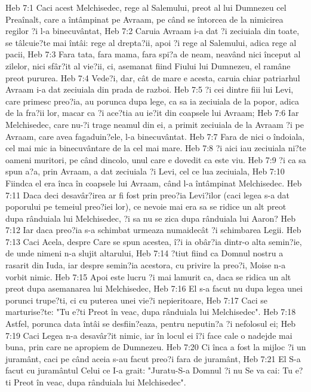Heb 7:1  Caci acest Melchisedec, rege al Salemului, preot al lui Dumnezeu cel Preaînalt, care a întâmpinat pe Avraam, pe când se întorcea de la nimicirea regilor ?i l-a binecuvântat,
Heb 7:2  Caruia Avraam i-a dat ?i zeciuiala din toate, se tâlcuie?te mai întâi: rege al drepta?ii, apoi ?i rege al Salemului, adica rege al pacii,
Heb 7:3  Fara tata, fara mama, fara spi?a de neam, neavând nici început al zilelor, nici sfâr?it al vie?ii, ci, asemanat fiind Fiului lui Dumnezeu, el ramâne preot pururea.
Heb 7:4  Vede?i, dar, cât de mare e acesta, caruia chiar patriarhul Avraam i-a dat zeciuiala din prada de razboi.
Heb 7:5  ?i cei dintre fiii lui Levi, care primesc preo?ia, au porunca dupa lege, ca sa ia zeciuiala de la popor, adica de la fra?ii lor, macar ca ?i ace?tia au ie?it din coapsele lui Avraam;
Heb 7:6  Iar Melchisedec, care nu-?i trage neamul din ei, a primit zeciuiala de la Avraam ?i pe Avraam, care avea fagaduin?ele, l-a binecuvântat.
Heb 7:7  Fara de nici o îndoiala, cel mai mic ia binecuvântare de la cel mai mare.
Heb 7:8  ?i aici iau zeciuiala ni?te oameni muritori, pe când dincolo, unul care e dovedit ca este viu.
Heb 7:9  ?i ca sa spun a?a, prin Avraam, a dat zeciuiala ?i Levi, cel ce lua zeciuiala,
Heb 7:10  Fiindca el era înca în coapsele lui Avraam, când l-a întâmpinat Melchisedec.
Heb 7:11  Daca deci desavâr?irea ar fi fost prin preo?ia Levi?ilor (caci legea s-a dat poporului pe temeiul preo?iei lor), ce nevoie mai era sa se ridice un alt preot dupa rânduiala lui Melchisedec, ?i sa nu se zica dupa rânduiala lui Aaron?
Heb 7:12  Iar daca preo?ia s-a schimbat urmeaza numaidecât ?i schimbarea Legii.
Heb 7:13  Caci Acela, despre Care se spun acestea, î?i ia obâr?ia dintr-o alta semin?ie, de unde nimeni n-a slujit altarului,
Heb 7:14  ?tiut fiind ca Domnul nostru a rasarit din Iuda, iar despre semin?ia acestora, cu privire la preo?i, Moise n-a vorbit nimic.
Heb 7:15  Apoi este lucru ?i mai lamurit ca, daca se ridica un alt preot dupa asemanarea lui Melchisedec,
Heb 7:16  El s-a facut nu dupa legea unei porunci trupe?ti, ci cu puterea unei vie?i nepieritoare,
Heb 7:17  Caci se marturise?te: "Tu e?ti Preot în veac, dupa rânduiala lui Melchisedec".
Heb 7:18  Astfel, porunca data întâi se desfiin?eaza, pentru neputin?a ?i nefolosul ei;
Heb 7:19  Caci Legea n-a desavâr?it nimic, iar în locul ei î?i face cale o nadejde mai buna, prin care ne apropiem de Dumnezeu.
Heb 7:20  Ci înca a fost la mijloc ?i un juramânt, caci pe când aceia s-au facut preo?i fara de juramânt,
Heb 7:21  El S-a facut cu juramântul Celui ce I-a grait: "Juratu-S-a Domnul ?i nu Se va cai: Tu e?ti Preot în veac, dupa rânduiala lui Melchisedec".
